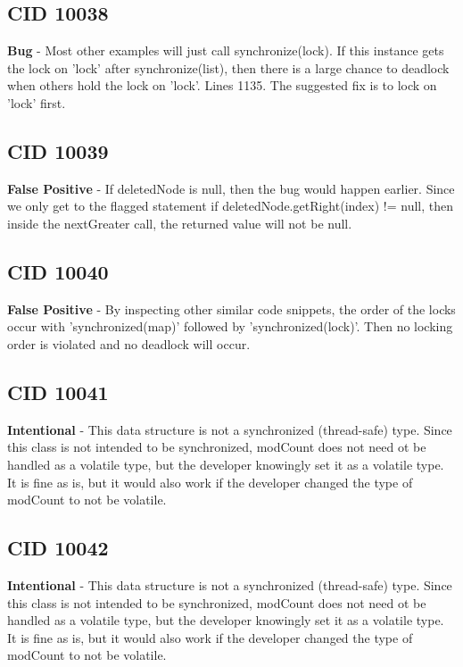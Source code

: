 \documentclass[12pt]{article}
\begin{document}
\subsection{CID 10038}
\textbf{Bug} - Most other examples will just call synchronize(lock). If this instance gets the lock on 'lock' after synchronize(list), then there is a large chance to deadlock when others hold the lock on 'lock'. Lines 1135. The suggested fix is to lock on 'lock' first.
\subsection{CID 10039}
\textbf{False Positive} - If deletedNode is null, then the bug would happen earlier. Since we only get to the flagged statement if deletedNode.getRight(index) != null, then inside the nextGreater call, the returned value will not be null.
\subsection{CID 10040}
\textbf{False Positive} - By inspecting other similar code snippets, the order of the locks occur with 'synchronized(map)' followed by 'synchronized(lock)'. Then no locking order is violated and no deadlock will occur.
\subsection{CID 10041}
\textbf{Intentional} - This data structure is not a synchronized (thread-safe) type. Since this class is not intended to be synchronized, modCount does not need ot be handled as a volatile type, but the developer knowingly set it as a volatile type. It is fine as is, but it would also work if the developer changed the type of modCount to not be volatile.
\subsection{CID 10042}
\textbf{Intentional} - This data structure is not a synchronized (thread-safe) type. Since this class is not intended to be synchronized, modCount does not need ot be handled as a volatile type, but the developer knowingly set it as a volatile type. It is fine as is, but it would also work if the developer changed the type of modCount to not be volatile.
\end{document}
